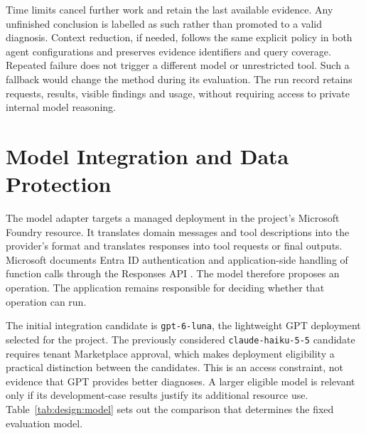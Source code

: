 Time limits cancel further work and retain the last available evidence.
Any unfinished conclusion is labelled as such rather than promoted to a
valid diagnosis. Context reduction, if needed, follows the same explicit
policy in both agent configurations and preserves evidence identifiers
and query coverage. Repeated failure does not trigger a different model
or unrestricted tool. Such a fallback would change the method during its
evaluation. The run record retains requests, results, visible findings and
usage, without requiring access to private internal model reasoning.

\section{Model Integration and Data Protection}
\label{sec:design:model}

The model adapter targets a managed deployment in the project's Microsoft
Foundry resource. It translates domain messages and tool descriptions into
the provider's format and translates responses into tool requests or final
outputs. Microsoft documents Entra ID authentication and application-side
handling of function calls through the Responses API
\parencite{microsoft2026responses}. The model therefore proposes an
operation. The application remains responsible for deciding whether that
operation can run.

The initial integration candidate is \texttt{gpt-6-luna}, the lightweight
GPT deployment selected for the project. The previously considered
\texttt{claude-haiku-5-5} candidate requires tenant Marketplace approval,
which makes deployment eligibility
a practical distinction between the candidates. This is an access
constraint, not evidence that GPT provides better diagnoses. A larger
eligible model is relevant only if its development-case results justify
its additional resource use. Table~\ref{tab:design:model} sets out the
comparison that determines the fixed evaluation model.

